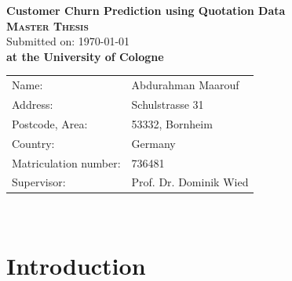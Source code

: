 \documentclass[12pt,titlepage]{article}
\begin{document}
\thispagestyle{empty}

\begin{titlepage}\centering
    \begin{center}
        \vspace*{\fill}
        \huge \textbf{\textsf{Customer Churn Prediction using Quotation Data}}\\
        \vspace{2cm}
        \LARGE\textbf{\textsc{Master Thesis}}\\
        \vspace{1cm}
        \normalsize
        Submitted on: \today \\
        \vspace{2.5cm}
        \large \textbf{at the University of Cologne}
        \vspace{3cm}
    \end{center}
    \normalsize{
        \begin{tabular}{ll}
            Name: & {Abdurahman Maarouf} \\
            Address: & {Schulstrasse 31} \\
            Postcode, Area: & {53332, Bornheim} \\
            Country: & {Germany} \\
            Matriculation number: & {736481} \\
            Supervisor: & {Prof. Dr. Dominik Wied} \\
        \end{tabular}\\
    }
    \vspace*{\fill}

\end{titlepage}

\thispagestyle{empty}

\tableofcontents

\newpage


\setcounter{page}{1}

\section{Introduction} \par
\end{document}
